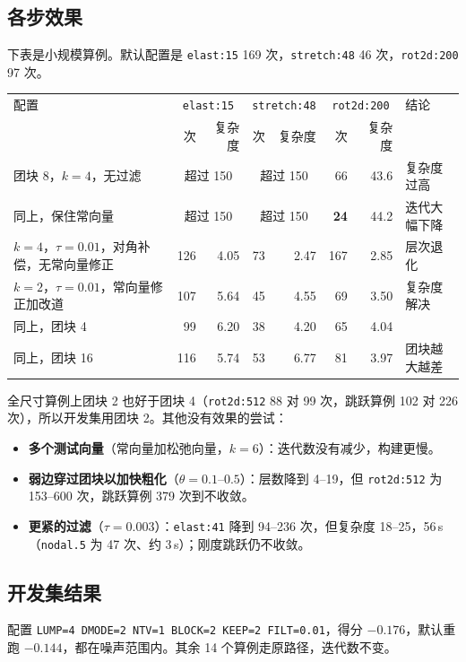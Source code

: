 \documentclass[11pt,a4paper]{ctexart}
\begin{document}
\subsection{各步效果}
下表是小规模算例。默认配置是 \texttt{elast:15} 169 次，\texttt{stretch:48} 46 次，\texttt{rot2d:200} 97 次。

\begin{table}[H]
\centering\footnotesize
\begin{tabular}{lrrrrrrl}
\toprule
配置 & \multicolumn{2}{c}{\texttt{elast:15}} & \multicolumn{2}{c}{\texttt{stretch:48}} & \multicolumn{2}{c}{\texttt{rot2d:200}} & 结论 \\
 & 次 & 复杂度 & 次 & 复杂度 & 次 & 复杂度 & \\
\midrule
团块 8，$k=4$，无过滤 & \multicolumn{2}{c}{超过 150} & \multicolumn{2}{c}{超过 150} & 66 & 43.6 & 复杂度过高 \\
同上，保住常向量 & \multicolumn{2}{c}{超过 150} & \multicolumn{2}{c}{超过 150} & \textbf{24} & 44.2 & 迭代大幅下降 \\
$k=4$，$\tau=0.01$，对角补偿，无常向量修正 & 126 & 4.05 & 73 & 2.47 & 167 & 2.85 & 层次退化 \\
$k=2$，$\tau=0.01$，常向量修正加改道 & 107 & 5.64 & 45 & 4.55 & 69 & 3.50 & 复杂度解决 \\
同上，团块 4 & 99 & 6.20 & 38 & 4.20 & 65 & 4.04 & \\
同上，团块 16 & 116 & 5.74 & 53 & 6.77 & 81 & 3.97 & 团块越大越差 \\
\bottomrule
\end{tabular}
\end{table}

全尺寸算例上团块 2 也好于团块 4（\texttt{rot2d:512} 88 对 99 次，跳跃算例 102 对 226 次），所以开发集用团块 2。其他没有效果的尝试：
\begin{itemize}
\item \textbf{多个测试向量}（常向量加松弛向量，$k=6$）：迭代数没有减少，构建更慢。
\item \textbf{弱边穿过团块以加快粗化}（$\theta=0.1$--$0.5$）：层数降到 4--19，但 \texttt{rot2d:512} 为 153--600 次，跳跃算例 379 次到不收敛。
\item \textbf{更紧的过滤}（$\tau=0.003$）：\texttt{elast:41} 降到 94--236 次，但复杂度 18--25，56\,s（\texttt{nodal.5} 为 47 次、约 3\,s）；刚度跳跃仍不收敛。
\end{itemize}

\subsection{开发集结果}
配置 \texttt{LUMP=4 DMODE=2 NTV=1 BLOCK=2 KEEP=2 FILT=0.01}，得分 $-0.176$，默认重跑 $-0.144$，都在噪声范围内。其余 14 个算例走原路径，迭代数不变。
\end{document}
